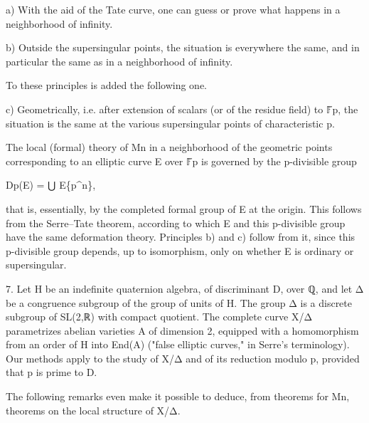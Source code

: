 \documentclass[11pt,a4paper]{article}
\begin{document}
a) With the aid of the Tate curve, one can guess or prove what happens in a neighborhood of infinity.

b) Outside the supersingular points, the situation is everywhere the same, and in particular the same as in a neighborhood of infinity.

To these principles is added the following one.

c) Geometrically, i.e. after extension of scalars (or of the residue field) to \ensuremath{\mathbb{F}}̄\textunderscore{}p, the situation is the same at the various supersingular points of characteristic p.

The local (formal) theory of M\textunderscore{}n in a neighborhood of the geometric points corresponding to an elliptic curve E over \ensuremath{\mathbb{F}}̄\textunderscore{}p is governed by the p-divisible group

D\textunderscore{}p(E) = ⋃ E\textunderscore{}\{p\textasciicircum{}n\},

that is, essentially, by the completed formal group of E at the origin. This follows from the Serre–Tate theorem, according to which E and this p-divisible group have the same deformation theory. Principles b) and c) follow from it, since this p-divisible group depends, up to isomorphism, only on whether E is ordinary or supersingular.

7.      Let H be an indefinite quaternion algebra, of discriminant D, over ℚ, and let Δ be a congruence subgroup of the group of units of H. The group Δ is a discrete subgroup of SL(2,ℝ) with compact quotient. The complete curve X/Δ parametrizes abelian varieties A of dimension 2, equipped with a homomorphism from an order of H into End(A) ("false elliptic curves," in Serre's terminology). Our methods apply to the study of X/Δ and of its reduction modulo p, provided that p is prime to D.

The following remarks even make it possible to deduce, from theorems for M\textunderscore{}n, theorems on the local structure of X/Δ.
\end{document}

